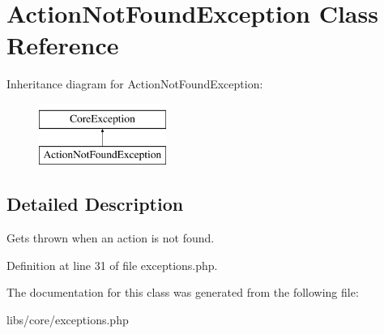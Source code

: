 \hypertarget{class_action_not_found_exception}{\section{\-Action\-Not\-Found\-Exception \-Class \-Reference}
\label{class_action_not_found_exception}
}
\-Inheritance diagram for \-Action\-Not\-Found\-Exception\-:\begin{figure}[H]
\begin{center}
\leavevmode
\includegraphics[height=2.000000cm]{class_action_not_found_exception}
\end{center}
\end{figure}


\subsection{\-Detailed \-Description}
\-Gets thrown when an action is not found. 

\-Definition at line 31 of file exceptions.\-php.



\-The documentation for this class was generated from the following file\-:\begin{DoxyCompactItemize}
\item 
libs/core/exceptions.\-php\end{DoxyCompactItemize}
